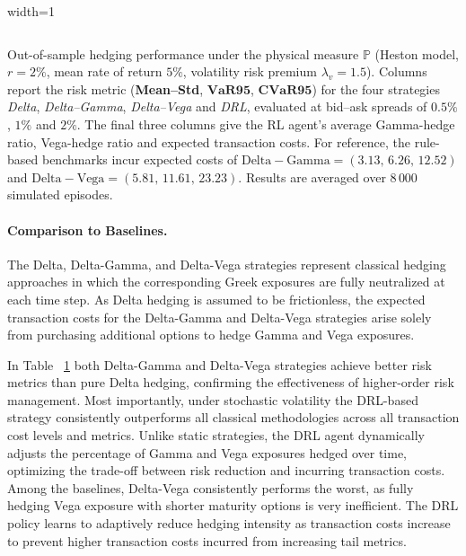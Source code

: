 \documentclass[a4paper,fleqn]{cas-dc}
\begin{document}
\begin{table}[pos=h]
\begin{adjustbox}{width=1\textwidth}
\begin{tabular}{llccccccc}
\bottomrule
\end{tabular}
\end{adjustbox}
\justifying \small
Out-of-sample hedging performance under the physical measure $\mathbb{P}$ 
(Heston model, $r=2\%$, mean rate of return $5\%$, volatility risk premium $\lambda_v=1.5$).  
Columns report the risk metric (\textbf{Mean–Std}, $\mathbf{VaR95}$, $\mathbf{CVaR95}$) for the four strategies 
\emph{Delta}, \emph{Delta–Gamma}, \emph{Delta–Vega} and \emph{DRL},  
evaluated at bid–ask spreads of $0.5\%$, $1\%$ and $2\%$.  
The final three columns give the RL agent’s average Gamma-hedge ratio, Vega-hedge ratio and expected transaction costs.  
For reference, the rule-based benchmarks incur expected costs of  
$\mathrm{Delta\!-\!Gamma}=(3.13,\,6.26,\,12.52)$ and  
$\mathrm{Delta\!-\!Vega}=(5.81,\,11.61,\,23.23)$. Results are averaged over $8\,000$ simulated episodes.
\vspace{-5pt}
\label{table:hestontableWdrift}
\end{table}



\paragraph*{Comparison to Baselines.}
The Delta, Delta-Gamma, and Delta-Vega strategies represent classical hedging approaches in which the corresponding Greek exposures are fully neutralized at each time step. As Delta hedging is assumed to be frictionless, the expected transaction costs for the Delta-Gamma and Delta-Vega strategies arise solely from purchasing additional options to hedge Gamma and Vega exposures. 

In Table ~\ref{table:hestontableWdrift} both Delta-Gamma and Delta-Vega strategies achieve better risk metrics than pure Delta hedging, confirming the effectiveness of higher-order risk management. Most importantly, under stochastic volatility the DRL-based strategy consistently outperforms all classical methodologies across all transaction cost levels and metrics. Unlike static strategies, the DRL agent dynamically adjusts the percentage of Gamma and Vega exposures hedged over time, optimizing the trade-off between risk reduction and incurring transaction costs. Among the baselines, Delta-Vega consistently performs the worst, as fully hedging Vega exposure with shorter maturity options is very inefficient. The DRL policy learns to adaptively reduce hedging intensity as transaction costs increase to prevent higher transaction costs incurred from increasing tail metrics.
\end{document}
